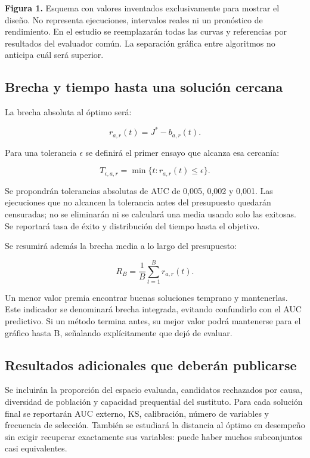 \documentclass[11pt,letterpaper]{article}
\begin{document}
\textbf{Figura 1.} Esquema con valores inventados exclusivamente para mostrar el diseño. No representa ejecuciones, intervalos reales ni un pronóstico de rendimiento. En el estudio se reemplazarán todas las curvas y referencias por resultados del evaluador común. La separación gráfica entre algoritmos no anticipa cuál será superior.

\subsection{Brecha y tiempo hasta una solución cercana}\label{sec:11.2}

La brecha absoluta al óptimo será:

\[
r_{a,r}(t)=J^*-b_{a,r}(t).
\]

Para una tolerancia \(\epsilon\) se definirá el primer ensayo que alcanza esa cercanía:

\[
T_{\epsilon,a,r}=\min\{t:r_{a,r}(t)\leq\epsilon\}.
\]

Se propondrán tolerancias absolutas de AUC de 0,005, 0,002 y 0,001. Las ejecuciones que no alcancen la tolerancia antes del presupuesto quedarán censuradas; no se eliminarán ni se calculará una media usando solo las exitosas. Se reportará tasa de éxito y distribución del tiempo hasta el objetivo.

Se resumirá además la brecha media a lo largo del presupuesto:

\[
R_B=\frac{1}{B}\sum_{t=1}^{B}r_{a,r}(t).
\]

Un menor valor premia encontrar buenas soluciones temprano y mantenerlas. Este indicador se denominará brecha integrada, evitando confundirlo con el AUC predictivo. Si un método termina antes, su mejor valor podrá mantenerse para el gráfico hasta B, señalando explícitamente que dejó de evaluar.

\subsection{Resultados adicionales que deberán publicarse}\label{sec:11.3}

Se incluirán la proporción del espacio evaluada, candidatos rechazados por causa, diversidad de población y capacidad prequential del sustituto. Para cada solución final se reportarán AUC externo, KS, calibración, número de variables y frecuencia de selección. También se estudiará la distancia al óptimo en desempeño sin exigir recuperar exactamente sus variables: puede haber muchos subconjuntos casi equivalentes.
\end{document}
